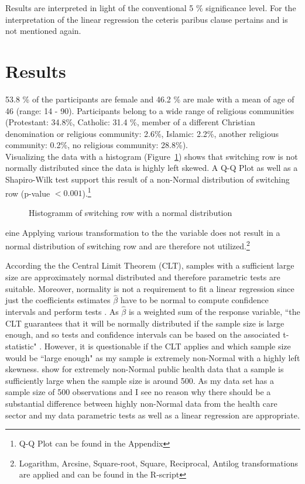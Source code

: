 \documentclass[10pt,a4paper]{article}
\begin{document}
Results are interpreted in light of the conventional 5 \% significance level. For the interpretation of the linear regression the ceteris paribus clause pertains and is not mentioned again.

\section{Results}


53.8 \% of the participants are female and 46.2 \% are male with a mean of age of 46 (range: 14 - 90). Participants belong to a wide range of religious communities (Protestant: 34.8\%, Catholic: 31.4 \%, member of a different Christian denomination or religious community: 2.6\%, Islamic: 2.2\%, another religious community: 0.2\%, no religious community: 28.8\%).\\
 
Visualizing the data with a histogram (Figure~\ref{fig:a}) shows that switching row is not normally distributed since the data is highly left skewed. A Q-Q Plot as well as a Shapiro-Wilk test support this result of a non-Normal distribution of switching row (p-value $< 0.001$).\footnote{Q-Q Plot can be found in the Appendix}\\

\begin{figure}[!htbp] 
\begin{center}
\caption{Histogramm of switching row with a normal distribution}\label{fig:a}
\scalebox{0.5}{
}
\end{center}
\end{figure}
eine
Applying various transformation to the the variable does not result in a normal distribution of switching row and are therefore not utilized.\footnote{Logarithm, Arcsine, Square-root, Square, Reciprocal, Antilog transformations are applied and can be found in the R-script} 

According the the Central Limit Theorem (CLT), samples with a sufficient large size are approximately normal distributed and therefore parametric tests are suitable. Moreover, normality is not a requirement to fit a linear regression since just the coefficients estimates $\hat{\beta}$ have to be normal to compute confidence intervals and perform tests \parencite{lumley2002importance}. As $\hat{\beta}$ is a weighted sum of the response variable, “the CLT guarantees that it will be normally distributed if the sample size is large enough, and so tests and confidence intervals can be based on the associated t-statistic" \parencite{lumley2002importance}. However, it is questionable if the CLT applies and which sample size would be “large enough" as my sample is extremely non-Normal with a highly left skewness. \textcite{lumley2002importance} show for extremely non-Normal public health data that a sample is sufficiently large when the sample size is around 500. As my data set has a sample size of 500 observations and I see no reason why there should be a substantial difference between highly non-Normal data from the health care sector and my data parametric tests as well as a linear regression are appropriate.\\
\end{document}
